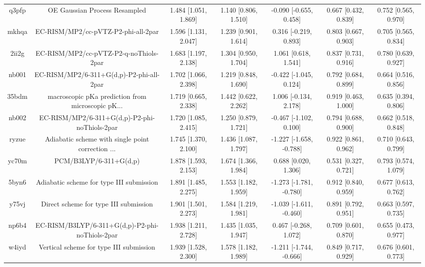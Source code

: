 \documentclass{article}
\begin{document}
\begin{center}
\begin{longtable}{|ccccccc|}
 q3pfp &                      OE Gaussian Process Resampled &  1.484 [1.051, 1.869] &  1.140 [0.806, 1.510] &   -0.090 [-0.655, 0.458] &  0.667 [0.432, 0.839] &   0.752 [0.565, 0.970] \\
 mkhqa &                EC-RISM/MP2/cc-pVTZ-P2-phi-all-2par &  1.596 [1.131, 2.047] &  1.239 [0.901, 1.614] &    0.316 [-0.219, 0.893] &  0.803 [0.667, 0.903] &   0.705 [0.565, 0.834] \\
 2ii2g &             EC-RISM/MP2/cc-pVTZ-P2-q-noThiols-2par &  1.683 [1.197, 2.138] &  1.304 [0.950, 1.704] &     1.061 [0.618, 1.541] &  0.837 [0.731, 0.916] &   0.780 [0.639, 0.927] \\
 nb001 &           EC-RISM/MP2/6-311+G(d,p)-P2-phi-all-2par &  1.702 [1.066, 2.398] &  1.219 [0.848, 1.690] &   -0.422 [-1.045, 0.124] &  0.792 [0.684, 0.899] &   0.664 [0.516, 0.856] \\
 35bdm &  macroscopic pKa prediction from microscopic pK... &  1.719 [0.665, 2.338] &  1.442 [0.622, 2.262] &    1.006 [-0.134, 2.178] &  0.919 [0.463, 1.000] &   0.635 [0.394, 0.806] \\
 nb002 &      EC-RISM/MP2/6-311+G(d,p)-P2-phi-noThiols-2par &  1.720 [1.085, 2.415] &  1.250 [0.879, 1.721] &   -0.467 [-1.102, 0.100] &  0.794 [0.688, 0.900] &   0.662 [0.518, 0.848] \\
 ryzue &  Adiabatic scheme with single point correction ... &  1.745 [1.370, 2.100] &  1.436 [1.087, 1.797] &  -1.227 [-1.658, -0.788] &  0.922 [0.861, 0.962] &   0.710 [0.643, 0.799] \\
 yc70m &                             PCM/B3LYP/6-311+G(d,p) &  1.878 [1.593, 2.153] &  1.674 [1.366, 1.984] &     0.688 [0.020, 1.306] &  0.531 [0.327, 0.721] &   0.793 [0.574, 1.079] \\
 5byn6 &           Adiabatic scheme for type III submission &  1.891 [1.485, 2.275] &  1.553 [1.182, 1.959] &  -1.273 [-1.781, -0.780] &  0.912 [0.840, 0.959] &   0.677 [0.613, 0.762] \\
 y75vj &              Direct scheme for type III submission &  1.901 [1.501, 2.273] &  1.584 [1.219, 1.981] &  -1.039 [-1.611, -0.460] &  0.891 [0.792, 0.951] &   0.663 [0.597, 0.735] \\
 np6b4 &    EC-RISM/B3LYP/6-311+G(d,p)-P2-phi-noThiols-2par &  1.938 [1.211, 2.728] &  1.435 [1.035, 1.947] &    0.467 [-0.268, 1.072] &  0.709 [0.601, 0.870] &   0.655 [0.473, 0.977] \\
 w4iyd &            Vertical scheme for type III submission &  1.939 [1.528, 2.300] &  1.578 [1.182, 1.989] &  -1.211 [-1.744, -0.666] &  0.849 [0.717, 0.929] &   0.676 [0.601, 0.773] \\

\end{longtable}
\end{center}
\end{document}
